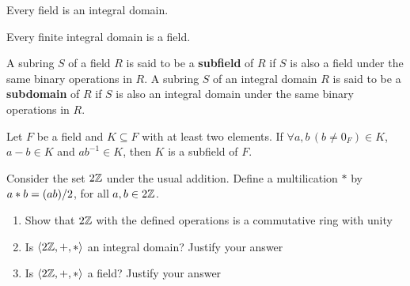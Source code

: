 \begin{theorem}
    Every field is an integral domain.
\end{theorem}

\begin{theorem}
    Every finite integral domain is a field.
\end{theorem}

\begin{definition}
    A subring $S$ of a field $R$ is said to be a \textbf{subfield} of $R$ if $S$ is also a field under the same binary operations in $R$. A subring $S$ of an integral domain $R$ is said to be a \textbf{subdomain} of $R$ if $S$ is  also an integral domain under the same binary operations in $R$.
\end{definition}

\begin{theorem}
    Let $F$ be a field and $K \subseteq F$ with at least two elements. If $\forall a, b \, (b \neq 0_F) \in K$, $a - b \in K$ and $ab^{-1} \in K$, then $K$ is a subfield of $F$.
\end{theorem}

\begin{exercise}
    Consider the set $2\mathbb{Z}$ under the usual addition. Define a multilication $\ast$ by $a \ast b = \qty(ab)/2$, for all $a, b \in 2\mathbb{Z}$.
    \begin{enumerate}
        \item Show that $2\mathbb{Z}$ with the defined operations is a commutative ring with unity
        \item Is $\langle 2\mathbb{Z}, +, \ast \rangle$ an integral domain? Justify your answer
        \item Is $\langle 2\mathbb{Z}, +, \ast \rangle$ a field? Justify your answer
    \end{enumerate}
\end{exercise}

